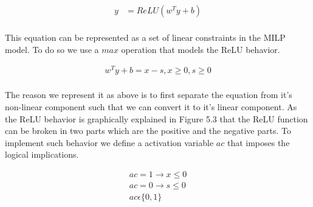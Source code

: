 \begin{equation}
\begin{aligned}
y &= ReLU(w^Ty + b) \\
\end{aligned}
\end{equation}

This equation can be represented as a set of linear constraints in the \ac{MILP} model. 
To do so we use a $max$ operation that models the ReLU behavior. 

\begin{equation}
\begin{aligned}
w^Ty + b = x - s, x \geq 0, s \geq 0 \\
\end{aligned}
\end{equation}

The reason we represent it as above is to first separate the equation from it's non-linear component such that we can convert it to it's linear component. 
As the ReLU behavior is graphically explained in Figure 5.3 that the ReLU function can be broken in two parts which are the positive and the negative parts.  
To implement such behavior we define a activation variable $ac$ that imposes the logical implications. 

\begin{equation}
\begin{aligned}
ac =  1 \rightarrow x \leq 0  \\
ac =  0 \rightarrow s \leq 0  \\
ac \epsilon  \{0,1\} \\
\end{aligned}
\end{equation}

